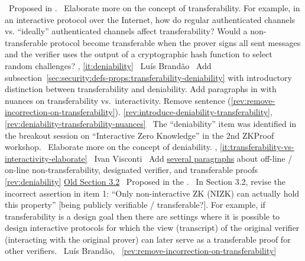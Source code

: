 \newcol \ccontext\ Proposed in .
				\propContrib\ Elaborate more on the concept of transferability. For example, in an interactive protocol over the Internet, how do regular authenticated channels vs. ``ideally'' authenticated channels affect transferability? Would a non-transferable protocol become transferable when the prover signs all sent messages and the verifier uses the output of a cryptographic hash function to select random challenges? 
\newcol {}, \ref{it:deniability}
\newcol \contributors\ Luís Brandão
				\Chan\ Add subsection~\ref{sec:security:defs-props:transferability-deniability} with introductory distinction between transferability and deniability.
				Add paragraphs in  with nuances on transferability vs.\ interactivity.
				Remove sentence (\ref{rev:remove-incorrection-on-transferability}).
\newcol \ref{rev:introduce-deniability-transferability}, \ref{rev:deniability-transferability-nuances}
\rowendL
\incItem[it:deniability]
\newcol \ccontext\ The ``deniability'' item was identified in the breakout session on ``Interactive Zero Knowledge'' in the 2nd ZKProof workshop.
				\propContrib\ Elaborate more on the concept of deniability.
\newcol {}, \ref{it:transferability-vs-interactivity-elaborate}
\newcol \contributors\ Ivan Visconti
				\Chan\ Add \hyperref[paradigms:interactivity:deniability:online-offline]{several paragraphs} about off-line / on-line non-transferability, designated verifier, and transferable proofs
\newcol \ref{rev:deniability}
\rowendL
\hyperref[apps:scope-use-cases]{Old Section 3.2}
\newcol \ccontext\ Proposed in the .
				\propContrib\ In Section 3.2, revise the incorrect assertion in item 1: ``Only non-interactive ZK (NIZK) can actually hold this property'' [being publicly verifiable / transferable?]. For example, if transferability is a design goal then there are settings where it is possible to design interactive protocols for which the view (transcript) of the original verifier (interacting with the original prover) can later serve as a transferable proof for other verifiers.
\newcol {}
\newcol \contributors\ Luís Brandão, 
				\Chan\ 
\newcol \ref{rev:remove-incorrection-on-transferability}
\rowendL
\myendIssue



